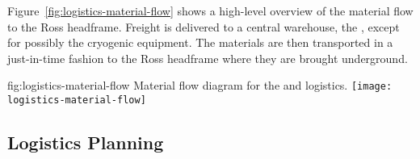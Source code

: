 
 
Figure~\ref{fig:logistics-material-flow} shows a high-level overview of the material flow to the Ross headframe. Freight is delivered to a central warehouse, the , except for possibly the cryogenic equipment. 
 The materials are then transported in a just-in-time fashion to the Ross headframe where they are brought underground. 
 
\begin{dunefigure}{fig:logistics-material-flow}
  {Material flow diagram for the  and  logistics.}
 \texttt{[image: logistics-material-flow]}
\end{dunefigure}


\subsection{Logistics Planning}
\label{sec:fdsp-tc-logPln}

